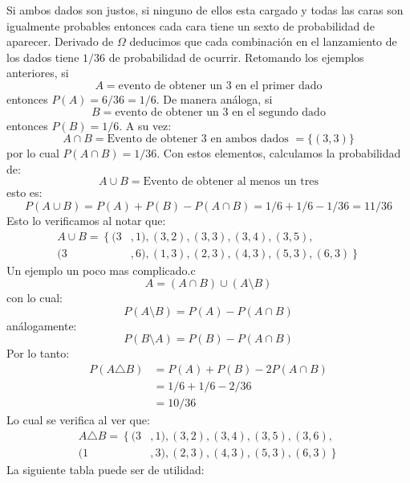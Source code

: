 \documentclass[14pt]{extreport}
\newcounter{ejemplo}[chapter]
\begin{document}
Si ambos dados son justos, si ninguno de ellos esta cargado y todas las caras son igualmente probables entonces cada cara tiene un sexto de probabilidad de aparecer. Derivado de $\Omega$ deducimos que cada combinación en el lanzamiento de los dados tiene $1/36$ de probabilidad de ocurrir. Retomando los ejemplos anteriores, si
$$
  A = \text{evento de obtener un 3 en el primer dado}
$$
entonces $P(A) = 6/36 = 1/6$. De manera análoga, si
$$
  B = \text{evento de obtener un 3 en el segundo dado}
$$
entonces $P(B) = 1/6$. A su vez:
$$
  A \cap B = \text{Evento de obtener 3 en ambos dados } = \{(3, 3)\}
$$
por lo cual $P(A \cap B) = 1/36$. Con estos elementos, calculamos la
probabilidad de:
$$
  A \cup B = \text{Evento de obtener al menos un tres}
$$
esto es:
$$
  P(A \cup B) = P(A) + P(B) - P(A \cap B) =  1/6 + 1/ 6 - 1/36 = 11/36
$$
Esto lo verificamos al notar que:
\begin{equation*}
  \begin{split}
    A \cup B = \left\{\right.(3&, 1), (3, 2), (3, 3), (3,4), (3, 5),\\
    (3&, 6), (1, 3), (2, 3), (4, 3), (5, 3), (6, 3)\left.\right\}
  \end{split}
\end{equation*}
Un ejemplo un poco mas complicado.c
$$
  A = (A \cap B) \cup (A \setminus B)
$$
con lo cual:
$$
  P(A \setminus B) = P(A) - P(A \cap B)
$$
análogamente:
$$
  P(B \setminus A) = P(B) - P(A \cap B)
$$
Por lo tanto:
\begin{equation*}
  \begin{split}
    P(A \triangle B) & = P(A) + P(B) - 2P(A \cap B) \\
    & = 1/6 + 1/6 -2/36 \\
    & = 10/36
  \end{split}
\end{equation*}
Lo cual se verifica al ver que:
\begin{equation*}
  \begin{split}
    A \triangle B = \left\{\right. (3&, 1), (3, 2),(3, 4), (3, 5), (3, 6),\\
    (1&, 3), (2, 3), (4, 3), (5, 3), (6, 3)\left.\right\}
  \end{split}
\end{equation*}
La siguiente tabla puede ser de utilidad:
\renewcommand{\arraystretch}{1.5}
\end{document}
